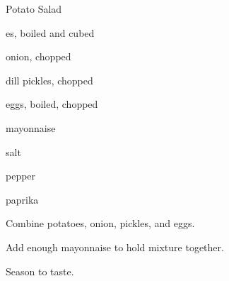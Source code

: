 \begin{recipe}{Potato Salad}{}{}

\begin{ingredients}
\item {}es, boiled and cubed
\item onion, chopped
\item dill pickles, chopped
\item eggs, boiled, chopped
\item mayonnaise
\item salt
\item pepper
\item paprika
\end{ingredients}

\begin{directions}
\item Combine potatoes, onion, pickles, and eggs.
\item Add enough mayonnaise to hold mixture together.
\item Season to taste.
\end{directions}

\end{recipe}

